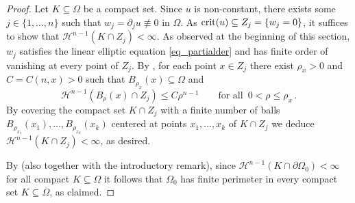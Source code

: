 \documentclass[10 pt,a4paper]{article}
\theoremstyle{definition}
\begin{document}
\begin{proof}
	Let $K\subseteq\Omega$ be a compact set. Since $u$ is non-constant, there exists some $j\in\{1,\dots,n\}$ such that $w_j = \partial_j u \not\equiv 0$ in $\Omega$. As ${\rm crit}(u) \subseteq Z_j = \{ w_j = 0 \}$, it suffices to show that $\mathscr H^{n-1}(K\cap Z_j) < \infty$.
	As observed at the beginning of this section, $w_j$ satisfies the linear elliptic equation \eqref{eq_partialder} and has finite order of vanishing at every point of $Z_j$. By \cite[Theorem 1.7]{HS89}, for each point $x\in Z_j$ there exist $\rho_x>0$ and $C=C(n,x)>0$ such that $B_{\rho_x}(x) \subseteq \Omega$ and
	\[
	\mathscr{H}^{n-1}(B_\rho(x) \cap Z_j) \leq C \rho^{n-1} \qquad \text{for all } \, 0 < \rho \leq \rho_x \, .
	\]
	By covering the compact set $K\cap Z_j$ with a finite number of balls $B_{\rho_{x_1}}(x_1),\dots,B_{\rho_{x_k}}(x_k)$ centered at points $x_1,\dots,x_k$ of $K\cap Z_j$ we deduce $\mathscr{H}^{n-1}(K \cap Z_j) < \infty$, as desired.
	
	By \cite[Theorem 4.5.11]{federer} (also \cite[Proposition 3.62]{ambrosiofuscopallara} together with the introductory remark), since $\mathscr H^{n-1}(K\cap\partial\Omega_0) < \infty$ for all compact $K\subseteq\Omega$ it follows that $\Omega_0$ has finite perimeter in every compact set $K\subseteq\Omega$, as claimed.
\end{proof}
\end{document}
